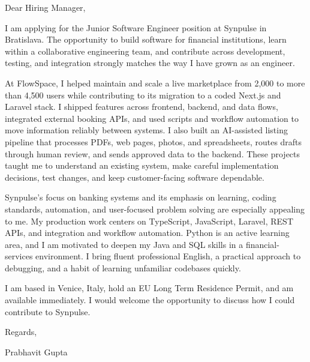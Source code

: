 \documentclass[a4paper,11pt]{article}
\begin{document}
Dear Hiring Manager,

I am applying for the Junior Software Engineer position at Synpulse in Bratislava. The opportunity to build software for financial institutions, learn within a collaborative engineering team, and contribute across development, testing, and integration strongly matches the way I have grown as an engineer.

At FlowSpace, I helped maintain and scale a live marketplace from 2,000 to more than 4,500 users while contributing to its migration to a coded Next.js and Laravel stack. I shipped features across frontend, backend, and data flows, integrated external booking APIs, and used scripts and workflow automation to move information reliably between systems. I also built an AI-assisted listing pipeline that processes PDFs, web pages, photos, and spreadsheets, routes drafts through human review, and sends approved data to the backend. These projects taught me to understand an existing system, make careful implementation decisions, test changes, and keep customer-facing software dependable.

Synpulse's focus on banking systems and its emphasis on learning, coding standards, automation, and user-focused problem solving are especially appealing to me. My production work centers on TypeScript, JavaScript, Laravel, REST APIs, and integration and workflow automation. Python is an active learning area, and I am motivated to deepen my Java and SQL skills in a financial-services environment. I bring fluent professional English, a practical approach to debugging, and a habit of learning unfamiliar codebases quickly.

I am based in Venice, Italy, hold an EU Long Term Residence Permit, and am available immediately. I would welcome the opportunity to discuss how I could contribute to Synpulse.

Regards,
\par
Prabhavit Gupta
\end{document}
